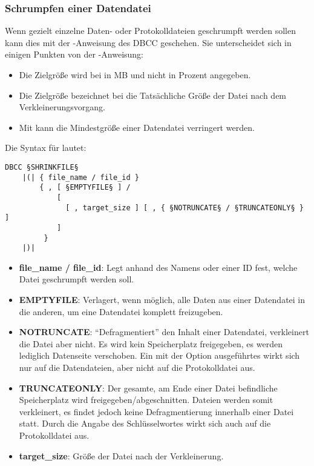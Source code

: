         \subsubsection{Schrumpfen einer Datendatei}
          Wenn gezielt einzelne Daten- oder Protokolldateien geschrumpft werden
          sollen kann dies mit der -Anweisung des DBCC
          geschehen. Sie unterscheidet sich in einigen Punkten von der
          -Anweisung:
          \begin{itemize}
              \item Die Zielgröße wird bei  in MB und
              nicht in Prozent angegeben.
              \item Die Zielgröße bezeichnet bei  die
              Tatsächliche Größe der Datei nach dem Verkleinerungsvorgang.
              \item Mit  kann die Mindestgröße einer
              Datendatei verringert werden.
          \end{itemize}
          Die Syntax für  lautet:
          \begin{lstlisting}[language=ebnf, caption={Die Syntax zu
          SHRINKFILE}, label=admin03_36]
DBCC §SHRINKFILE§
    |(| { file_name / file_id }
        { , [ §EMPTYFILE§ ] / 
            [ 
              [ , target_size ] [ , { §NOTRUNCATE§ / §TRUNCATEONLY§ } ]
            ]
         }
    |)|
          \end{lstlisting}
          \begin{itemize}
            \item \textbf{file\_name / file\_id}: Legt anhand des
            Namens oder einer ID fest, welche Datei geschrumpft werden soll.
            \item \textbf{EMPTYFILE}: Verlagert, wenn möglich, alle Daten aus
            einer Datendatei in die anderen, um eine Datendatei komplett
            freizugeben.
            \item \textbf{NOTRUNCATE}: \enquote{Defragmentiert} den
            Inhalt einer Datendatei, verkleinert die Datei aber nicht. Es wird
            kein Speicherplatz freigegeben, es werden lediglich Datenseite
            verschoben. Ein mit der Option 
            ausgeführtes  wirkt sich nur
            auf die Datendateien, aber nicht auf die Protokolldatei aus.
            \item \textbf{TRUNCATEONLY}: Der gesamte, am Ende einer
            Datei befindliche Speicherplatz wird freigegeben/abgeschnitten.
            Dateien werden somit verkleinert, es findet jedoch keine
            Defragmentierung innerhalb einer Datei statt. Durch die Angabe
            des Schlüsselwortes  wirkt sich
             auch auf die Protokolldatei aus.
            \item \textbf{target\_size}: Größe der Datei nach der
            Verkleinerung.
          \end{itemize}
